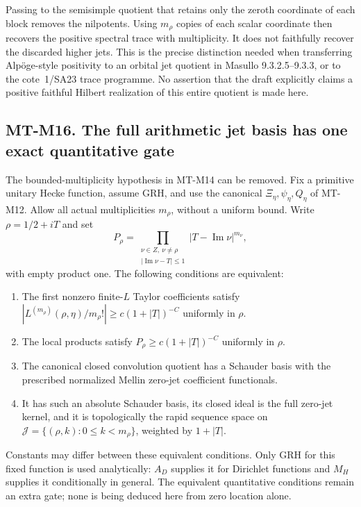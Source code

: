 \documentclass[11pt,a4paper]{article}
\begin{document}
Passing to the semisimple quotient that retains only the
zeroth coordinate of each block removes the nilpotents.
Using $m_\rho$ copies of each scalar coordinate then
recovers the positive spectral trace with multiplicity.
It does not faithfully recover the discarded higher
jets. This is the precise distinction needed when
transferring Alpöge-style positivity to an orbital
jet quotient in Masullo 9.3.2.5--9.3.3, or to the
cote~1/SA23 trace programme. No assertion that the
draft explicitly claims a positive faithful Hilbert
realization of this entire quotient is made here.

\subsection*{MT-M16. The full arithmetic jet basis has one exact quantitative gate}
The bounded-multiplicity hypothesis in MT-M14 can be removed.
Fix a primitive unitary Hecke function, assume GRH, and use
the canonical $\Xi_\eta,\psi_\eta,Q_\eta$ of MT-M12.
Allow all actual multiplicities $m_\rho$, without a uniform
bound. Write $\rho=1/2+iT$ and set
\[
 P_\rho=
  \prod_{\substack{\nu\in Z,\ \nu\ne\rho\\
              |\operatorname{Im}\nu-T|\le1}}
              |T-\operatorname{Im}\nu|^{m_\nu},
\]
with empty product one. The following conditions are equivalent:
\begin{enumerate}
\item The first nonzero finite-$L$ Taylor coefficients satisfy
$|L^{(m_\rho)}(\rho,\eta)/m_\rho!|
                       \ge c(1+|T|)^{-C}$ uniformly in $\rho$.
\item The local products satisfy
$P_\rho\ge c(1+|T|)^{-C}$ uniformly in $\rho$.
\item The canonical closed convolution quotient has a
Schauder basis with the prescribed normalized Mellin
zero-jet coefficient functionals.
\item It has such an absolute Schauder basis, its closed
ideal is the full zero-jet kernel, and it is topologically
the rapid sequence space on
$\mathcal J=\{(\rho,k):0\le k<m_\rho\}$, weighted by $1+|T|$.
\end{enumerate}
Constants may differ between these equivalent conditions.
Only GRH for this fixed function is used analytically:
$A_D$ supplies it for Dirichlet functions and $M_H$
supplies it conditionally in general. The equivalent
quantitative conditions remain an extra gate; none is
being deduced here from zero location alone.
\end{document}
